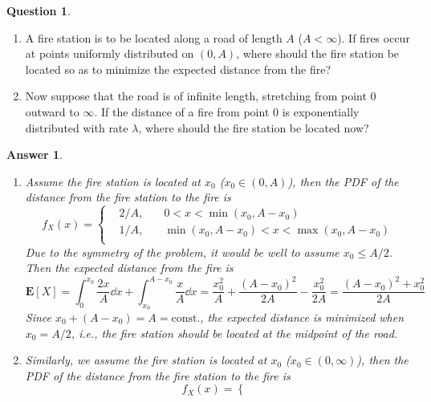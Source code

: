 \documentclass[utf8]{article}
\theoremstyle{definition}%
\newtheorem{question}{Question} %
\theoremstyle{plain}%
\newtheorem{answer}{Answer} %
\begin{document}
\begin{question} ~
    \begin{enumerate}[label=(\alph*)]
        \item A fire station is to be located along a road of length $A$ ($A < \infty$). If fires occur at points uniformly distributed on $(0, A)$, where should the fire station be located so as to minimize the expected distance from the fire?
        \item Now suppose that the road is of infinite length, stretching from point 0 outward to $\infty$. If the distance of a fire from point 0 is exponentially distributed with rate $\lambda$, where should the fire station be located now?
    \end{enumerate}
\end{question}
\begin{answer} ~
    \begin{enumerate}[label=(\alph*)]
        \item Assume the fire station is located at $x_0$ ($x_0 \in (0, A)$), then the PDF of the distance from the fire station to the fire is
        \begin{equation}
            f_{X}(x) = \left\{
            \begin{aligned}
                &2/A, \quad &0 < x < \min(x_0, A - x_0) \\
                &1/A, \quad &\min(x_0, A - x_0) < x < \max(x_0, A - x_0) \\
            \end{aligned}\right.
        \end{equation}
        Due to the symmetry of the problem, it would be well to assume $x_0 \leq A/2$. Then the expected distance from the fire is
        \begin{equation}
            \mathbf{E}[X] = \int_{0}^{x_0}\frac{2x}{A}\dd{x} + \int_{x_0}^{A - x_0}\frac{x}{A}\dd{x} = \frac{x_0^2}{A} + \frac{(A - x_0)^2}{2A} - \frac{x_0^2}{2A} = \frac{(A - x_0)^2 + x_0^2}{2A}
        \end{equation}
        Since $x_0 + (A - x_0) = A = \text{const.}$, the expected distance is minimized when $x_0 = A/2$, i.e., the fire station should be located at the midpoint of the road.
        \item Similarly, we assume the fire station is located at $x_0$ ($x_0 \in (0, \infty)$), then the PDF of the distance from the fire station to the fire is
        \begin{equation}
            f_{X}(x) = \left\{
            \begin{aligned}

\end{aligned}
\end{equation}
\end{enumerate}
\end{answer}
\end{document}
